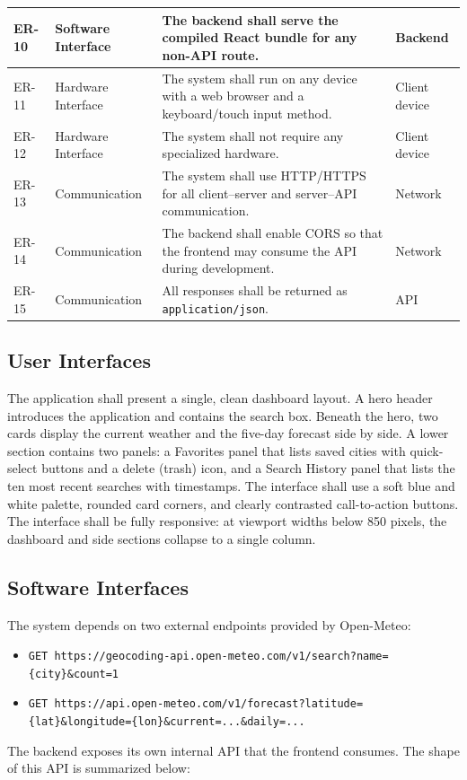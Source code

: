 \documentclass[11pt,letterpaper]{article}
\begin{document}
\begin{longtable}{| C{0.55in} | L{1.05in} | L{3.4in} | L{1in} |}
ER-10 & Software Interface & The backend shall serve the compiled React bundle for any non-API route. & Backend \\ \hline
ER-11 & Hardware Interface & The system shall run on any device with a web browser and a keyboard/touch input method. & Client device \\ \hline
{}ER-12 & Hardware Interface & The system shall not require any specialized hardware. & Client device \\ \hline
ER-13 & Communication & The system shall use HTTP/HTTPS for all client--server and server--API communication. & Network \\ \hline
{}ER-14 & Communication & The backend shall enable CORS so that the frontend may consume the API during development. & Network \\ \hline
ER-15 & Communication & All responses shall be returned as \texttt{application/json}. & API \\ \hline
\end{longtable}

\subsection{User Interfaces}
The application shall present a single, clean dashboard layout. A hero header introduces the application and contains the search box. Beneath the hero, two cards display the current weather and the five-day forecast side by side. A lower section contains two panels: a Favorites panel that lists saved cities with quick-select buttons and a delete (trash) icon, and a Search History panel that lists the ten most recent searches with timestamps. The interface shall use a soft blue and white palette, rounded card corners, and clearly contrasted call-to-action buttons. The interface shall be fully responsive: at viewport widths below 850 pixels, the dashboard and side sections collapse to a single column.

\subsection{Software Interfaces}
The system depends on two external endpoints provided by Open-Meteo:
\begin{itemize}
  \item \texttt{GET https://geocoding-api.open-meteo.com/v1/search?name=\{city\}\&count=1}
  \item \texttt{GET https://api.open-meteo.com/v1/forecast?latitude=\{lat\}\&longitude=\{lon\}\&current=...\&daily=...}
\end{itemize}
The backend exposes its own internal API that the frontend consumes. The shape of this API is summarized below:
\end{document}
